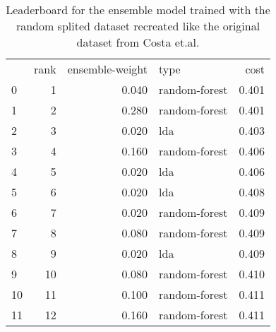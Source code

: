 \begin{table}[]
	\centering
	\begin{tabular}{lrrlr}
		   & rank & ensemble-weight & type          & cost  \\
		0  & 1    & 0.040           & random-forest & 0.401 \\
		1  & 2    & 0.280           & random-forest & 0.401 \\
		2  & 3    & 0.020           & lda           & 0.403 \\
		3  & 4    & 0.160           & random-forest & 0.406 \\
		4  & 5    & 0.020           & lda           & 0.406 \\
		5  & 6    & 0.020           & lda           & 0.408 \\
		6  & 7    & 0.020           & random-forest & 0.409 \\
		7  & 8    & 0.080           & random-forest & 0.409 \\
		8  & 9    & 0.020           & lda           & 0.409 \\
		9  & 10   & 0.080           & random-forest & 0.410 \\
		10 & 11   & 0.100           & random-forest & 0.411 \\
		11 & 12   & 0.160           & random-forest & 0.411 \\
	\end{tabular}

	\caption{Leaderboard for the ensemble model trained with the random splited dataset recreated like the original dataset from Costa et.al. }
	\label{tab:lb-from-costaetal-self-org-randsplit}
\end{table}

